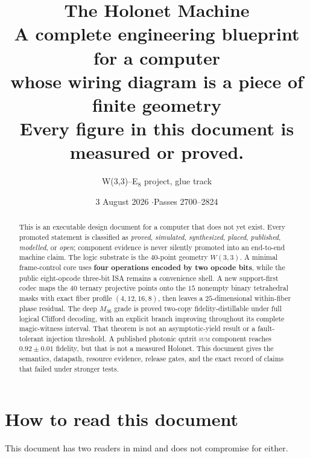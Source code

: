 \documentclass[11pt,a4paper]{article}
\title{\vspace{-1.4cm}\Huge The Holonet Machine\\[4pt]
       \large A complete engineering blueprint for a computer\\
       whose wiring diagram is a piece of finite geometry\\[10pt]
       \normalsize Every figure in this document is measured or proved.}
\author{\normalsize W(3,3)--E$_8$ project, glue track}
\date{\normalsize 3 August 2026 \quad$\cdot$\quad Passes 2700--2824}
\begin{document}
\maketitle
\thispagestyle{fancy}

\begin{abstract}
\noindent
This is an executable design document for a computer that does not yet exist. Every
promoted statement is classified as \emph{proved}, \emph{simulated}, \emph{synthesized},
\emph{placed}, \emph{published}, \emph{modelled}, or \emph{open}; component evidence is
never silently promoted into an end-to-end machine claim. The logic substrate is the
$40$-point geometry $W(3,3)$. A minimal frame-control core uses \textbf{four operations
encoded by two opcode bits}, while the public eight-opcode three-bit ISA remains a
convenience shell. A new support-first codec maps the $40$ ternary projective points onto
the $15$ nonempty binary tetrahedral masks with exact fiber profile $(4,12,16,8)$, then
leaves a $25$-dimensional within-fiber phase residual. The deep $M_{36}$ grade is proved
two-copy fidelity-distillable under full logical Clifford decoding, with an explicit
branch improving throughout its complete magic-witness interval. That theorem is not an
asymptotic-yield result or a fault-tolerant injection threshold. A published photonic
qutrit \textsc{sum} component reaches $0.92\pm0.01$ fidelity, but that is not a measured
Holonet. This document gives the semantics, datapath, resource evidence, release gates,
and the exact record of claims that failed under stronger tests.
\end{abstract}

\vspace{-4mm}
\tableofcontents
\newpage
\section{How to read this document}

This document has two readers in mind and does not compromise for either.
\end{document}
